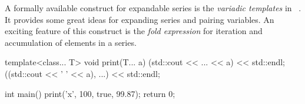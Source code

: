 A formally available construct for expandable series is the {\em variadic templates} in {\CPP}~\cite{ISO:2023:n4950}.
It provides some great ideas for expanding series and pairing variables.
An exciting feature of this construct is the {\em fold expression} for iteration and accumulation of elements in a series.

\begin{dispCPP}
template<class... T>
void print(T... a)
{
    (std::cout << ... << a) << std::endl;
    ((std::cout << ' ' << a), ...) << std::endl;
}

int main()
{
    print('x', 100, true, 99.87);
    return 0;
}
\end{dispCPP}

\endinput

